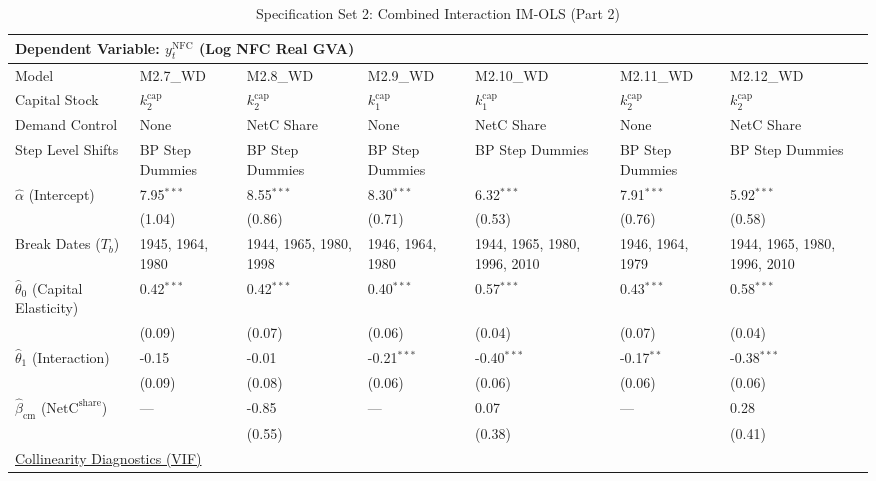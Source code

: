 \begin{table}[H]
\centering
\caption{Specification Set 2: Combined Interaction IM-OLS (Part 2)}
\label{tab:paper_spec_set_2_2}
\scriptsize
\begin{tabular}{p{3.8cm}p{1.35cm}p{1.35cm}p{1.35cm}p{1.35cm}p{1.35cm}p{1.35cm}}
\toprule
\multicolumn{7}{l}{\textbf{Dependent Variable: $y_t^{\text{NFC}}$ (Log NFC Real GVA)}} \\
\midrule
Model & M2.7\_WD & M2.8\_WD & M2.9\_WD & M2.10\_WD & M2.11\_WD & M2.12\_WD  \\
Capital Stock & $k^{\text{cap}}_2$ & $k^{\text{cap}}_2$ & $k^{\text{cap}}_1$ & $k^{\text{cap}}_1$ & $k^{\text{cap}}_2$ & $k^{\text{cap}}_2$  \\
Demand Control & None & NetC Share & None & NetC Share & None & NetC Share  \\
Step Level Shifts & BP Step Dummies & BP Step Dummies & BP Step Dummies & BP Step Dummies & BP Step Dummies & BP Step Dummies  \\
\midrule
$\hat{\alpha}$ (Intercept)  & 7.95$^{***}$ & 8.55$^{***}$ & 8.30$^{***}$ & 6.32$^{***}$ & 7.91$^{***}$ & 5.92$^{***}$  \\
 & {\scriptsize (1.04)} & {\scriptsize (0.86)} & {\scriptsize (0.71)} & {\scriptsize (0.53)} & {\scriptsize (0.76)} & {\scriptsize (0.58)}  \\
Break Dates ($T_b$) & 1945, 1964, 1980 & 1944, 1965, 1980, 1998 & 1946, 1964, 1980 & 1944, 1965, 1980, 1996, 2010 & 1946, 1964, 1979 & 1944, 1965, 1980, 1996, 2010  \\
[1ex]
$\hat{\theta}_0$ (Capital Elasticity)  & 0.42$^{***}$ & 0.42$^{***}$ & 0.40$^{***}$ & 0.57$^{***}$ & 0.43$^{***}$ & 0.58$^{***}$  \\
 & {\scriptsize (0.09)} & {\scriptsize (0.07)} & {\scriptsize (0.06)} & {\scriptsize (0.04)} & {\scriptsize (0.07)} & {\scriptsize (0.04)}  \\
$\hat{\theta}_1$ (Interaction)  & -0.15 & -0.01 & -0.21$^{***}$ & -0.40$^{***}$ & -0.17$^{**}$ & -0.38$^{***}$  \\
 & {\scriptsize (0.09)} & {\scriptsize (0.08)} & {\scriptsize (0.06)} & {\scriptsize (0.06)} & {\scriptsize (0.06)} & {\scriptsize (0.06)}  \\
$\hat{\beta}_{\text{cm}}$ ($\text{NetC}^{\text{share}}$)  & --- & -0.85 & --- & 0.07 & --- & 0.28  \\
 &  & {\scriptsize (0.55)} &  & {\scriptsize (0.38)} &  & {\scriptsize (0.41)}  \\
\midrule
\multicolumn{7}{l}{\underline{Collinearity Diagnostics (VIF)}} \\

\end{tabular}
\end{table}
